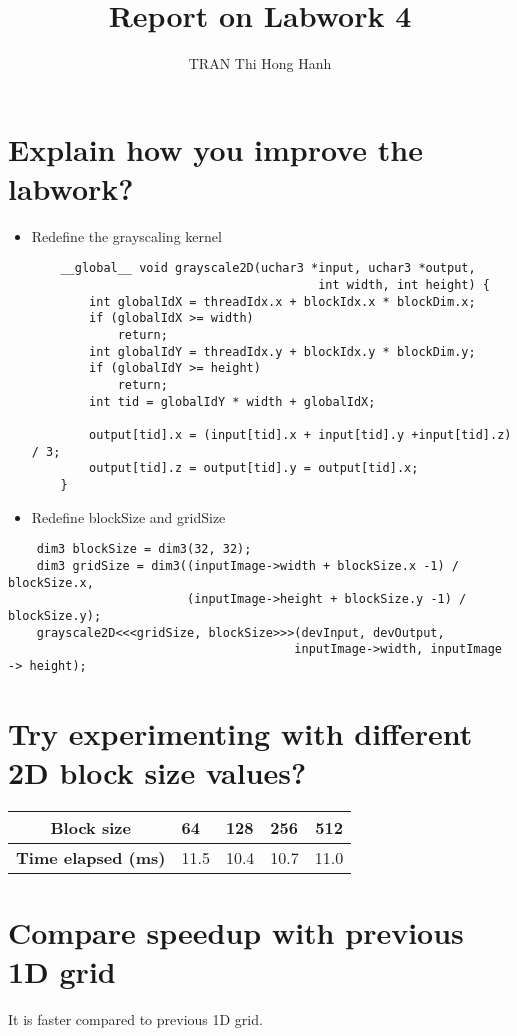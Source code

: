 \documentclass{article}
\title{Report on Labwork 4}
\author{TRAN Thi Hong Hanh}
\begin{document}
\maketitle
\section{Explain how you improve the labwork?}
    \begin{itemize}
    \item Redefine the grayscaling kernel
    \begin{verbatim}
    __global__ void grayscale2D(uchar3 *input, uchar3 *output, 
                                        int width, int height) {
        int globalIdX = threadIdx.x + blockIdx.x * blockDim.x;
        if (globalIdX >= width) 
            return;
        int globalIdY = threadIdx.y + blockIdx.y * blockDim.y;
        if (globalIdY >= height) 
            return;
        int tid = globalIdY * width + globalIdX;
    
        output[tid].x = (input[tid].x + input[tid].y +input[tid].z) / 3;
        output[tid].z = output[tid].y = output[tid].x;
    }
    \end{verbatim}
    \item Redefine blockSize and gridSize
    \end{itemize}
    \begin{verbatim}
    dim3 blockSize = dim3(32, 32);
    dim3 gridSize = dim3((inputImage->width + blockSize.x -1) / blockSize.x,
                         (inputImage->height + blockSize.y -1) / blockSize.y);
    grayscale2D<<<gridSize, blockSize>>>(devInput, devOutput,
                                        inputImage->width, inputImage -> height);
    \end{verbatim}
    
\section{Try experimenting with different 2D block size values?}
    \begin{table}[]
    \centering
    \begin{tabular}{|l|l|l|l|l|}
    \hline
    \multicolumn{1}{|c|}{\textbf{Block size}} & 64 & 128 & 256 & \multicolumn{1}{c|}{512} \\ \hline
    \textbf{Time elapsed (ms)} & 11.5 & 10.4 & 10.7 & 11.0\\ \hline
    \end{tabular}
    \end{table}
    
\section{Compare speedup with previous 1D grid}
\noindent
It is faster compared to previous 1D grid.
\end{document}
